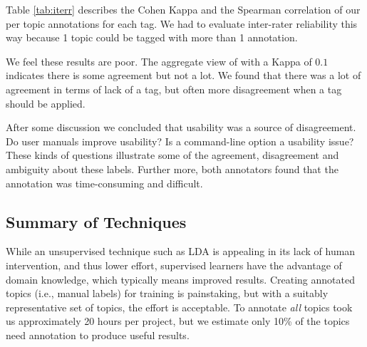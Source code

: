 \documentclass[smallextended]{svjour3}       %
\begin{document}
Table \ref{tab:iterr} describes the Cohen Kappa and the Spearman
correlation of our per topic annotations for each tag. We had to
evaluate inter-rater reliability this way because 1 topic could be
tagged with more than 1 annotation.

We feel these results are poor. The aggregate view of with a Kappa of
$0.1$ indicates there is some agreement but not a lot. We found that
there was a lot of agreement in terms of lack of a tag, but often more
disagreement when a tag should be applied.

After some discussion we concluded that usability was a source of
disagreement. Do user manuals improve usability? Is a command-line
option a usability issue? These kinds of questions illustrate some of
the agreement, disagreement and ambiguity about these labels. Further
more, both annotators found that the annotation was time-consuming and
difficult.






\subsection{Summary of Techniques}
While an unsupervised technique such as LDA is appealing in its lack of human intervention, and thus lower effort, 
supervised learners have the advantage of domain knowledge, which typically means improved results. 
Creating annotated topics (i.e., manual labels) for training is painstaking, but with a suitably representative set of topics, the effort is acceptable. To
annotate \emph{all} topics took us approximately 20 hours per project, but we estimate only 10\% of the topics need annotation to produce useful results.
\end{document}
